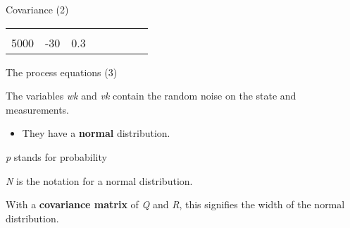 \documentclass[compress]{beamer}
\providecommand{\tightlist}{%
  \setlength{\itemsep}{0pt}\setlength{\parskip}{0pt}}
\begin{document}
\begin{frame}{Covariance (2)}
\begin{longtable}[c]{@{}llllllll@{}}
\begin{minipage}[t]{0.10\columnwidth}
\strut\end{minipage} &
\begin{minipage}[t]{0.10\columnwidth}\raggedright\strut
\strut\end{minipage} &
\begin{minipage}[t]{0.10\columnwidth}\raggedright\strut
\strut\end{minipage} &
\begin{minipage}[t]{0.10\columnwidth}\raggedright\strut
\strut\end{minipage} &
\begin{minipage}[t]{0.10\columnwidth}\raggedright\strut
\strut\end{minipage}\tabularnewline
\begin{minipage}[t]{0.10\columnwidth}\raggedright\strut
5000
\strut\end{minipage} &
\begin{minipage}[t]{0.10\columnwidth}\raggedright\strut
-30
\strut\end{minipage} &
\begin{minipage}[t]{0.10\columnwidth}\raggedright\strut
0.3
\strut\end{minipage} &
\begin{minipage}[t]{0.10\columnwidth}\raggedright\strut
\strut\end{minipage} &
\begin{minipage}[t]{0.10\columnwidth}\raggedright\strut
\strut\end{minipage} &
\begin{minipage}[t]{0.10\columnwidth}\raggedright\strut
\strut\end{minipage} &
\begin{minipage}[t]{0.10\columnwidth}\raggedright\strut
\strut\end{minipage} &
\begin{minipage}[t]{0.10\columnwidth}\raggedright\strut
\strut\end{minipage}\tabularnewline
\bottomrule
\end{longtable}

\end{frame}

\begin{frame}{The process equations (3)}

The variables \emph{wk} and \emph{vk} contain the random noise on the
state and measurements.

\begin{itemize}
\tightlist
\item
  They have a \textbf{normal} distribution.
\end{itemize}

\emph{p} stands for probability

\emph{N} is the notation for a normal distribution.

With a \textbf{covariance matrix} of \emph{Q} and \emph{R}, this
signifies the width of the normal distribution.

\end{frame}
\end{document}
